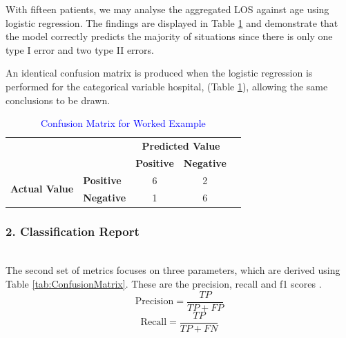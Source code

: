 \documentclass[../thesis.tex]{subfiles}
\begin{document}
With fifteen patients, we may analyse the aggregated LOS against age using logistic regression. The findings are displayed in Table \ref{tab:ConfusionMatrixEX1} and demonstrate that the model correctly predicts the majority of situations since there is only one type I error and two type II errors.

An identical confusion matrix is produced when the logistic regression is performed for the categorical variable hospital, (Table \ref{tab:ConfusionMatrixEX1}), allowing the same conclusions to be drawn.

\begin{table}[]
    \centering
    \begin{tabular}{clccc} \toprule
    && \multicolumn{2}{c}{\textbf{Predicted Value} }\\
         && \textbf{Positive} & \textbf{Negative}  \\ \midrule
      \multirow{2}{*}{\textbf{Actual Value}} &\textbf{Positive}   & 6 & 2   \\
      &\textbf{Negative}  & 1 & 6\\ \bottomrule
    \end{tabular}
\caption{\textcolor{blue}{Confusion Matrix for Worked Example}}
\label{tab:ConfusionMatrixEX1}
\end{table}



\subsubsection{2. Classification Report}\\
The second set of metrics focuses on three parameters, which are derived using Table \ref{tab:ConfusionMatrix}. These are the precision, recall and f1 scores \cite{Baratloo2015}.
\begin{equation}\label{eq:precision}
    \text{Precision} = \frac{TP}{TP + FP}
\end{equation}
\begin{equation}\label{eq:recall}
    \text{Recall} = \frac{TP}{TP + FN}
\end{equation}
\end{document}
